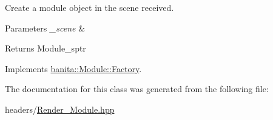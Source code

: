 Create a module object in the scene received. 


\begin{DoxyParams}{Parameters}
{\em \+\_\+scene} & \\
\hline
\end{DoxyParams}
\begin{DoxyReturn}{Returns}
Module\+\_\+sptr 
\end{DoxyReturn}


Implements \mbox{\hyperlink{classbanita_1_1_module_1_1_factory_a47b2217b54d08bb35dc4c1673cf87d35}{banita\+::\+Module\+::\+Factory}}.



The documentation for this class was generated from the following file\+:\begin{DoxyCompactItemize}
\item 
headers/\mbox{\hyperlink{_render___module_8hpp}{Render\+\_\+\+Module.\+hpp}}\end{DoxyCompactItemize}

